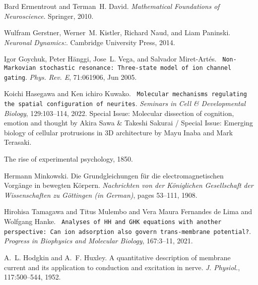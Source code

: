 \begin{DoxyDescription}
\item[\label{citelist_CITEREF_MathNeuroscience:2010}%
\mbox{[}18\mbox{]}]Bard Ermentrout and Terman~H. David. {\itshape Mathematical Foundations of Neuroscience}. Springer, 2010.


\item[\label{citelist_CITEREF_NeuralDynamicsGertsner:2014}%
\mbox{[}19\mbox{]}]Wulfram Gerstner, Werner~M. Kistler, Richard Naud, and Liam Paninski. {\itshape Neuronal Dynamics\+:}. Cambridge University Press, 2014.


\item[\label{citelist_CITEREF_MarkovianIonChannel:2005}%
\mbox{[}20\mbox{]}]Igor Goychuk, Peter H\"{a}nggi, Jose~L. Vega, and Salvador Miret-\/\+Art\'{e}s. {\texttt{ Non-\/\+Markovian stochastic resonance\+: Three-\/state model of ion channel gating}}. {\itshape Phys. Rev. E}, 71\+:061906, Jun 2005. 


\item[\label{citelist_CITEREF_NeuritsArbor:2022}%
\mbox{[}21\mbox{]}]Koichi Hasegawa and Ken ichiro Kuwako. {\texttt{ Molecular mechanisms regulating the spatial configuration of neurites}}. {\itshape Seminars in Cell \& Developmental Biology}, 129\+:103--114, 2022. Special Issue\+: Molecular dissection of cognition, emotion and thought by Akira Sawa \& Takeshi Sakurai / Special Issue\+: Emerging biology of cellular protrusions in 3D architecture by Mayu Inaba and Mark Terasaki. 


\item[\label{citelist_CITEREF_HelmoltzHistory:1851}%
\mbox{[}22\mbox{]}]The rise of experimental psychology, 1850.


\item[\label{citelist_CITEREF_Minkowski:1908}%
\mbox{[}23\mbox{]}]Hermann Minkowski. Die Grundgleichungen f\"{u}r die electromagnetischen Vorg\"{a}nge in bewegten K\"{o}rpern. {\itshape Nachrichten von der K\"{o}niglichen Gesellschaft der Wissenschaften zu G\"{o}ttingen (in German)}, pages 53--111, 1908.


\item[\label{citelist_CITEREF_Hodgkin-HuxleyAdsorption:2021}%
\mbox{[}24\mbox{]}]Hirohisa Tamagawa and Titus Mulembo and Vera Maura Fernandes de Lima and Wolfgang Hanke. {\texttt{ Analyses of HH and GHK equations with another perspective\+: Can ion adsorption also govern trans-\/membrane potential?}}. {\itshape Progress in Biophysics and Molecular Biology}, 167\+:3--11, 2021. 


\item[\label{citelist_CITEREF_HodgkinHuxley:1952}%
\mbox{[}25\mbox{]}]A.~L. Hodgkin and A.~F. Huxley. A quantitative description of membrane current and its application to conduction and excitation in nerve. {\itshape J. Physiol.}, 117\+:500--544, 1952.



\end{DoxyDescription}
